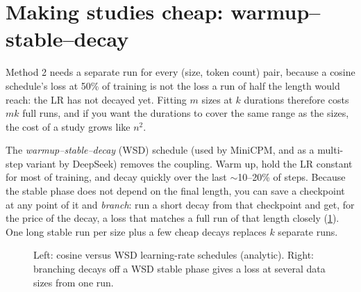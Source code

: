 \section{Making studies cheap: warmup--stable--decay}\label{sec:scalinglaws:wsd}

Method 2 needs a separate run for every (size, token count) pair, because a cosine schedule's
loss at 50\% of training is not the loss a run of half the length would reach: the LR has not
decayed yet. Fitting $m$ sizes at $k$ durations therefore costs $mk$ full runs, and if you want
the durations to cover the same range as the sizes, the cost of a study grows like $n^2$.

The \emph{warmup--stable--decay} (WSD) schedule (used by MiniCPM, and as a multi-step variant
by DeepSeek) removes the coupling. Warm up, hold the LR constant for most of training, and decay
quickly over the last $\sim$10--20\% of steps. Because the stable phase does not depend on the
final length, you can save a checkpoint at any point of it and \emph{branch}: run a short decay
from that checkpoint and get, for the price of the decay, a loss that matches a full run of that
length closely (\cref{fig:scalinglaws:wsd}). One long stable run per size plus a few cheap
decays replaces $k$ separate runs.

\begin{figure}[t]
\centering
{}\hfill
{}
\caption{Left: cosine versus WSD learning-rate schedules (analytic). Right: branching decays off
a WSD stable phase gives a loss at several data sizes from one run.}
\label{fig:scalinglaws:wsd}
\end{figure}

